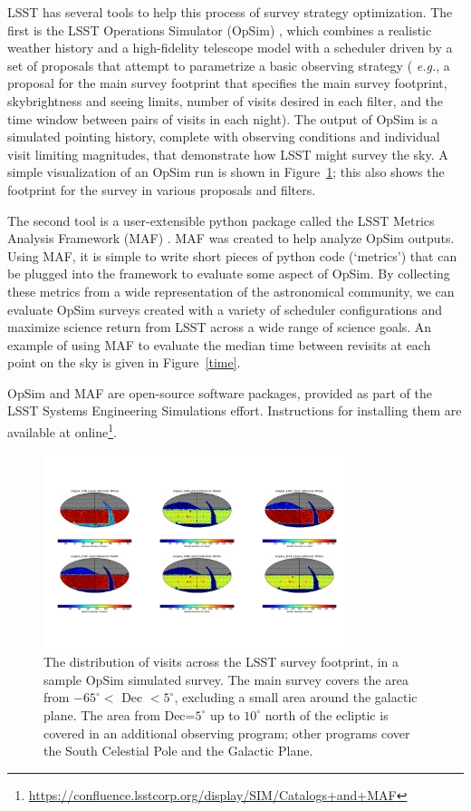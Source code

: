 \documentclass{iau}
\begin{document}
LSST has several tools to help this process of survey strategy
optimization. The first is the LSST Operations Simulator (OpSim)
\cite{opsim}, which combines a realistic weather history and a
high-fidelity telescope model with a scheduler driven by a set of
proposals that attempt to parametrize a basic observing strategy ({\it
e.g.}, a proposal for the main survey footprint that specifies the
main survey footprint, skybrightness and seeing limits, number of
visits desired in each filter, and the time window between pairs of
visits in each night). The output of OpSim is a simulated pointing
history, complete with observing conditions and individual visit
limiting magnitudes, that demonstrate how LSST might survey the sky. A
simple visualization of an OpSim run is shown in
Figure~\ref{footprint}; this also shows the footprint for the
survey in various proposals and filters.

The second tool is a user-extensible python package called the LSST
Metrics Analysis Framework (MAF) \cite{maf}. MAF was created to help
analyze OpSim outputs. Using MAF, it is simple to write short pieces
of python code (`metrics') that can be plugged into the framework to
evaluate some aspect of OpSim. By collecting these metrics from a wide
representation of the astronomical community, we can evaluate OpSim
surveys created with a variety of scheduler configurations and
maximize science return from LSST across a wide range of science
goals. An example of using MAF to evaluate the median time between
revisits at each point on the sky is given in Figure~\ref{time}.

OpSim and MAF are open-source software packages,
provided as part of the LSST Systems Engineering Simulations
effort. Instructions for installing them are available at
online\footnote{
\url{https://confluence.lsstcorp.org/display/SIM/Catalogs+and+MAF}}. 

\begin{figure}[tb]
\centering
\includegraphics[width=0.8\textwidth]{Nvisits}
\caption{The distribution of visits across the LSST survey footprint,
  in a sample OpSim simulated survey. The main survey covers the area
  from $-65^\circ<$ Dec $<5^\circ$, excluding a small area around the
  galactic plane. The area from Dec=$5^\circ$  up to $10^\circ$ north
  of the ecliptic is covered in an additional observing program; other
  programs cover the South Celestial Pole and the Galactic Plane.
\label{footprint}}
\end{figure}
\end{document}
